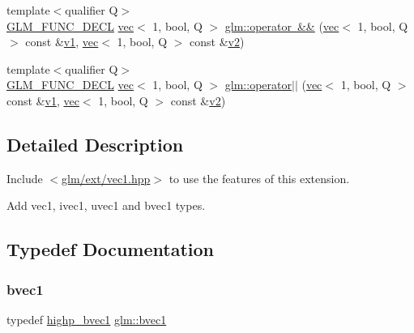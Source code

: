 \begin{DoxyCompactItemize}
\item 
{\footnotesize template$<$qualifier Q$>$ }\\\mbox{\hyperlink{setup_8hpp_ab2d052de21a70539923e9bcbf6e83a51}{G\+L\+M\+\_\+\+F\+U\+N\+C\+\_\+\+D\+E\+CL}} \mbox{\hyperlink{structglm_1_1vec}{vec}}$<$ 1, bool, Q $>$ \mbox{\hyperlink{group__ext__vec1_ga5836cbb5b58489de3281dc7460e4f2ce}{glm\+::operator \&\&}} (\mbox{\hyperlink{structglm_1_1vec}{vec}}$<$ 1, bool, Q $>$ const \&\mbox{\hyperlink{_s_d_l__opengl__glext_8h_a435c176a02c061b43e19bdf7c86cceae}{v1}}, \mbox{\hyperlink{structglm_1_1vec}{vec}}$<$ 1, bool, Q $>$ const \&\mbox{\hyperlink{_s_d_l__opengl__glext_8h_a0928f6d0f0f794ba000a21dfae422136}{v2}})
\item 
{\footnotesize template$<$qualifier Q$>$ }\\\mbox{\hyperlink{setup_8hpp_ab2d052de21a70539923e9bcbf6e83a51}{G\+L\+M\+\_\+\+F\+U\+N\+C\+\_\+\+D\+E\+CL}} \mbox{\hyperlink{structglm_1_1vec}{vec}}$<$ 1, bool, Q $>$ \mbox{\hyperlink{group__ext__vec1_ga121908a337ee4ab94414dfd4f3518d47}{glm\+::operator$\vert$$\vert$}} (\mbox{\hyperlink{structglm_1_1vec}{vec}}$<$ 1, bool, Q $>$ const \&\mbox{\hyperlink{_s_d_l__opengl__glext_8h_a435c176a02c061b43e19bdf7c86cceae}{v1}}, \mbox{\hyperlink{structglm_1_1vec}{vec}}$<$ 1, bool, Q $>$ const \&\mbox{\hyperlink{_s_d_l__opengl__glext_8h_a0928f6d0f0f794ba000a21dfae422136}{v2}})
\end{DoxyCompactItemize}


\subsection{Detailed Description}
Include $<$\mbox{\hyperlink{ext_2vec1_8hpp}{glm/ext/vec1.\+hpp}}$>$ to use the features of this extension.

Add vec1, ivec1, uvec1 and bvec1 types. 

\subsection{Typedef Documentation}
\mbox{\label{group__ext__vec1_ga30260c045e085bb8d19eddca772cac61}} 
\subsubsection{\texorpdfstring{bvec1}{bvec1}}
{\footnotesize\ttfamily typedef \mbox{\hyperlink{group__ext__vec1_gac7fdd0536d878f87393132b3a7f9ef03}{highp\+\_\+bvec1}} \mbox{\hyperlink{group__ext__vec1_ga30260c045e085bb8d19eddca772cac61}{glm\+::bvec1}}}

